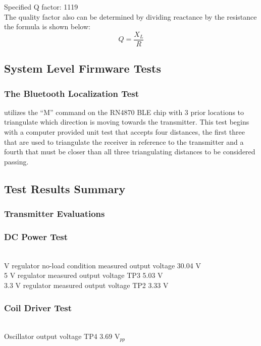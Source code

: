 \documentclass[12pt]{article}
\begin{document}
\noindent
Specified Q factor: 1119\\
 
 \noindent
The quality factor also can be determined by dividing reactance by the resistance the formula is shown below:
\begin{equation}
Q = \frac{X_L}{R}
\end{equation}

\subsection{System Level Firmware Tests}

\subsubsection*{The Bluetooth Localization Test} utilizes the “M” command on the RN4870 BLE chip with 3 prior locations to triangulate which direction is moving towards the transmitter.  This test begins with a computer provided unit test that accepts four distances, the first three that are used to triangulate the receiver in reference to the transmitter and a fourth that must be closer than all three triangulating distances to be considered passing.
\hfill 
\pagebreak

\subsection{Test Results Summary}

\subsubsection{Transmitter Evaluations} \hfill
\subsubsection*{DC Power Test} \hfill \\
 V regulator no-load condition measured output voltage 30.04 V\\
5 V regulator measured output voltage TP3 5.03 V\\
3.3 V regulator measured output voltage TP2 3.33 V\\
 
\subsubsection*{Coil Driver Test} \hfill \\
Oscillator output voltage TP4 3.69 V$_{pp}$\\
 
\end{document}
